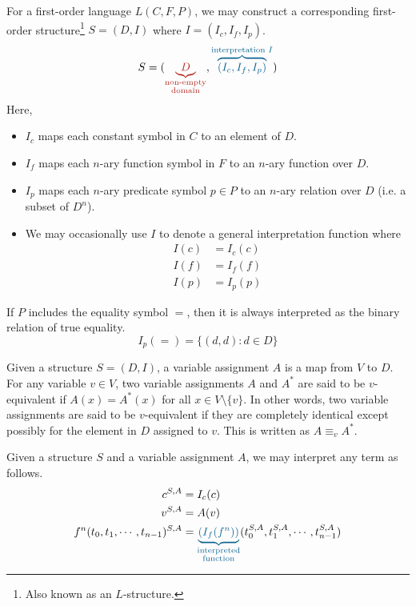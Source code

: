 For a first-order language \(L(C, F, P)\), we may construct a corresponding first-order structure\footnote{Also known as an \(L\)-structure.} \(S = (D, I)\) where \(I = (I_c, I_f, I_p)\).
%
{\large
    \[
        S = (
            {\color{BrickRed}
                \underbrace{D}_{\substack{
                    \text{non-empty}\\
                    \text{domain}
                }}
            }
            ,
            {\color{MidnightBlue}
                \overbrace{(
                    I_c,
                    I_f,
                    I_p
                )}^{\text{interpretation } I}
            }
        )
    \]
}
%
Here,
\begin{itemize}
    \item \(I_c\) maps each constant symbol in \(C\) to an element of \(D\).
    \item \(I_f\) maps each \(n\)-ary function symbol in \(F\) to an \(n\)-ary function over \(D\).
    \item \(I_p\) maps each \(n\)-ary predicate symbol \(p \in P\) to an \(n\)-ary relation over \(D\) (i.e. a subset of \(D^n\)).
    \item We may occasionally use \(I\) to denote a general interpretation function where
    \begin{align*}
        I(c) &= I_c (c) \tag{for all \(c \in C\)}\\
        I(f) &= I_f (f) \tag{for all \(f \in F\)}\\
        I(p) &= I_p (p) \tag{for all \(p \in P\)}
    \end{align*}
\end{itemize}

If \(P\) includes the equality symbol \(=\), then it is always interpreted as the binary relation of true equality.
%
\[I_p (=) = \{(d, d) : d \in D\}\]

Given a structure \(S = (D, I)\), a variable assignment \(A\) is a map from \(V\) to \(D\). For any variable \(v \in V\), two variable assignments \(A\) and \(A^{*}\) are said to be \(v\)-equivalent if \(A(x) = A^{*}(x)\) for all \(x \in V \setminus \{v\}\). In other words, two variable assignments are said to be \(v\)-equivalent if they are completely identical except possibly for the element in \(D\) assigned to \(v\). This is written as \(A \equiv_v A^{*}\).

Given a structure \(S\) and a variable assignment \(A\), we may interpret any term as follows.
%
\begin{align*}
    c^{S, A} &= I_c (c)\\
    v^{S, A} &= A(v)\\
    f^n (t_0, t_1, \cdots, t_{n-1})^{S, A} &= {\color{MidnightBlue} \underbrace{(I_f (f^n))}_{\substack{\text{interpreted}\\\text{function}}}} (t_0^{S, A}, t_1^{S, A}, \cdots, t_{n-1}^{S, A})
\end{align*}

